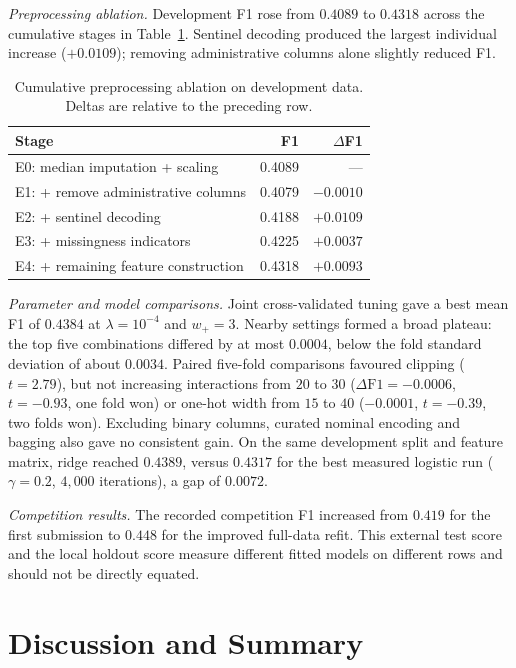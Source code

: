 \documentclass[10pt,conference,compsocconf]{IEEEtran}
\begin{document}
\textit{Preprocessing ablation.}
Development F1 rose from $0.4089$ to $0.4318$ across the cumulative
stages in Table~\ref{tab:ablation}. Sentinel decoding produced the
largest individual increase ($+0.0109$); removing administrative
columns alone slightly reduced F1.

\begin{table}[tbp]
  \centering
  \caption{Cumulative preprocessing ablation on development data.
  Deltas are relative to the preceding row.}
  \label{tab:ablation}
  \small
  \setlength{\tabcolsep}{3pt}
  \begin{tabular}{lrr}
    \hline
    Stage & F1 & $\Delta$F1 \\
    \hline
    E0: median imputation + scaling & 0.4089 & --- \\
    E1: + remove administrative columns & 0.4079 & $-0.0010$ \\
    E2: + sentinel decoding & 0.4188 & $+0.0109$ \\
    E3: + missingness indicators & 0.4225 & $+0.0037$ \\
    E4: + remaining feature construction & 0.4318 & $+0.0093$ \\
    \hline
  \end{tabular}
\end{table}

\textit{Parameter and model comparisons.}
Joint cross-validated tuning gave a best mean F1 of $0.4384$ at
$\lambda=10^{-4}$ and $w_{+}=3$. Nearby settings formed a broad plateau:
the top five combinations differed by at most $0.0004$, below the
fold standard deviation of about $0.0034$.
Paired five-fold comparisons favoured clipping ($t=2.79$), but not
increasing interactions from $20$ to $30$ ($\Delta\mathrm{F1}=-0.0006$,
$t=-0.93$, one fold won) or one-hot width from $15$ to $40$
($-0.0001$, $t=-0.39$, two folds won). Excluding binary columns,
curated nominal encoding and bagging also gave no consistent gain.
On the same development split and feature matrix, ridge reached
$0.4389$, versus $0.4317$ for the best measured logistic run
($\gamma=0.2$, $4{,}000$ iterations), a gap of $0.0072$.

\textit{Competition results.}
The recorded competition F1 increased from $0.419$ for the first
submission to $0.448$ for the improved full-data refit. This external
test score and the local holdout score measure different fitted models
on different rows and should not be directly equated.


\section{Discussion and Summary}
\label{sec:discussion}
\end{document}
